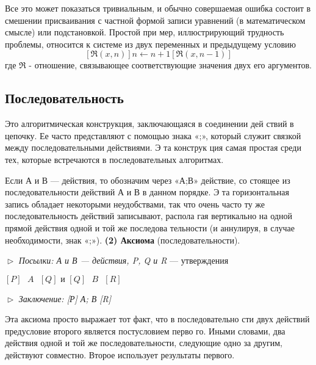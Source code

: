 \parindent=1cm Все  это  может  показаться  тривиальным,  и  обычно  совершаемая 
ошибка  состоит  в  смешении  присваивания с  частной  формой  записи 
уравнений (в математическом смысле)  или подстановкой. Простой при­
мер,  иллюстрирующий  трудность  проблемы,  относится  к  системе  из 
двух переменных  и  предыдущему  условию
\begin{equation*}
\textit{$[\Re(x,n)] n \leftarrow n + 1 [\Re(x,n - 1)]$}
	\end{equation*}
где $\Re$ - отношение,  связывающее соответствующие значения двух его 
аргументов.
\subsection{Последовательность}
\noindent Это  алгоритмическая конструкция,  заключающаяся  в соединении  дей­
ствий  в цепочку.  Ее часто представляют с помощью знака «;», который 
служит связкой  между  последовательными  действиями.  Э та конструк­
ция самая простая среди тех, которые встречаются в последовательных 
алгоритмах.

\parindent=1cm Если А и В — действия,  то обозначим  через  «А;В» действие, со­
стоящее из последовательности действий А и В в данном порядке. Э та 
горизонтальная запись обладает некоторыми неудобствами, так что 
очень часто ту же последовательность действий записывают, распола­
гая вертикально на одной прямой действия одной и той же последова­
тельности (и аннулируя, в случае необходимости, знак «;»).
\newline
\textbf{(2) Аксиома} (последовательности).
\newline

\noindent $\vartriangleright$ \textit{Посылки: А и В --- действия, P, Q и R} --- утверждения
\begin{center}
\textit{$[ P ]\textit{ }A\textit{ }[ Q ]  \text{ и } [Q]\textit{ }B\textit{ }[ R ]$}
\end{center}
\pagebreak
$\vartriangleright$ \textit{Заключение:  [Р] А; В [R]}
\newline

\parindent=1cm Эта  аксиома  просто  выражает  тот  факт,  что  в  последовательно­
сти двух действий  предусловие  второго является  постусловием  перво­
го. Иными словами, два действия одной и той же последовательности, 
следующие  одно за другим,  действуют  совместно.  Второе  использует 
результаты первого.

